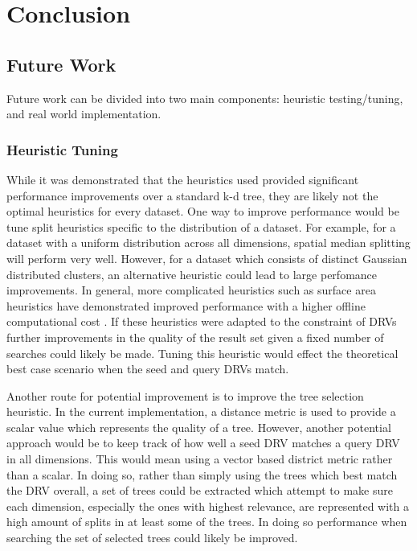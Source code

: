 \chapter{Conclusion} %

\label{conclusion} %


\section{Future Work}

Future work can be divided into two main components: heuristic testing/tuning, and real world implementation.

\subsection{Heuristic Tuning}

While it was demonstrated that the heuristics used provided significant performance improvements over a standard k-d tree, they are likely not the optimal heuristics for every dataset.  One way to improve performance would be tune split heuristics specific to the distribution of a dataset.  For example, for a dataset with a uniform distribution across all dimensions, spatial median splitting will perform very well.  However, for a dataset which consists of distinct Gaussian distributed clusters, an alternative heuristic could lead to large perfomance improvements.  In general, more complicated heuristics such as surface area heuristics have demonstrated improved performance with a higher offline computational cost \citep{hunt2006fast}.  If these heuristics were adapted to the constraint of DRVs further improvements in the quality of the result set given a fixed number of searches could likely be made.  Tuning this heuristic would effect the theoretical best case scenario when the seed and query DRVs match.

Another route for potential improvement is to improve the tree selection heuristic.  In the current implementation, a distance metric is used to provide a scalar value which represents the quality of a tree.  However, another potential approach would be to keep track of how well a seed DRV matches a query DRV in all dimensions.  This would mean using a vector based district metric rather than a scalar.  In doing so, rather than simply using the trees which best match the DRV overall, a set of trees could be extracted which attempt to make sure each dimension, especially the ones with highest relevance, are represented with a high amount of splits in at least some of the trees.  In doing so performance when searching the set of selected trees could likely be improved.

